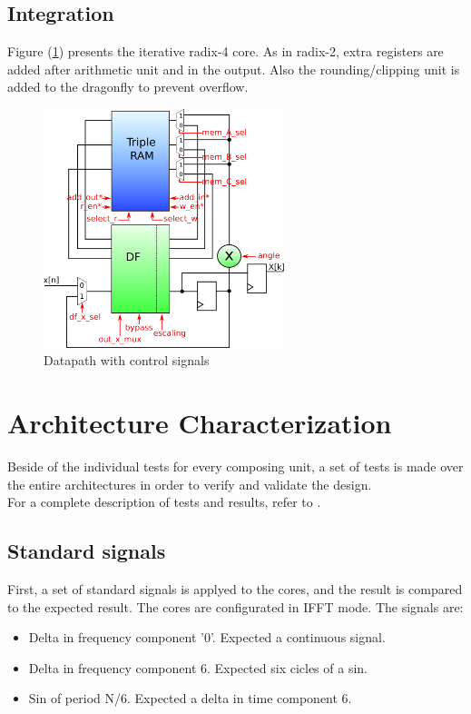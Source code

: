 \documentclass[conference]{IEEEtran}
\begin{document}
\subsection{Integration}

Figure (\ref{fig:datapathR4control}) presents the iterative radix-4 core. As in radix-2, extra registers are added after arithmetic unit and in 
the output. Also the rounding/clipping unit is added to the dragonfly to prevent overflow.  

\begin{figure}[htb!]
        \centering
        \includegraphics[width=7cm]{./figures/datapathR4control.png}
        \caption{Datapath with control signals}
        \label{fig:datapathR4control}
\end{figure} 
 
\section{Architecture Characterization}

Beside of the individual tests for every composing unit, a set of tests is made over the entire architectures in order to verify and validate the design.\\
For a complete description of tests and results, refer to \cite{tesis}.

\subsection{Standard signals}
First, a set of standard signals is applyed to the cores, and the result is compared to the expected result. The cores are 
configurated in IFFT mode.
The signals are:

\begin{itemize}
  \item Delta in frequency component '0'. Expected a continuous signal.
  \item Delta in frequency component 6. Expected six cicles of a sin.
  \item Sin of period N/6. Expected a delta in time component 6.
\end{itemize}
\end{document}
